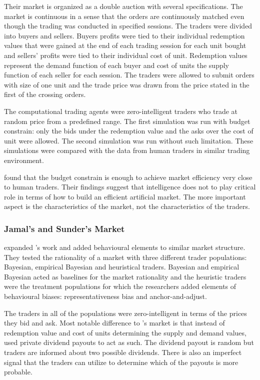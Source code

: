 Their market is organized as a double auction with several
specifications. The market is continuous in a sense that the 
orders are continuously matched even though the trading was
conducted in specified sessions. The traders were divided 
into buyers and sellers. Buyers profits were tied to their 
individual redemption values that were gained at the end of
each trading session for each unit bought and sellers' profits
were tied to their individual cost of unit. Redemption values
represent the demand function of each buyer and cost of units 
the supply function of each seller for each session. The
traders were allowed to submit orders with size of one unit
and the trade price was drawn from the price stated in the 
first of the crossing orders.

The computational trading agents were zero-intelligent traders 
who trade at random price from a predefined range. 
The first simulation was run with budget constrain: only the bids
under the redemption value and the asks over the cost of unit 
were allowed. The second simulation was run without such limitation.
These simulations were compared with the data from human traders
in similar trading environment.

\citeauthor{God93} found that the budget constrain is enough to 
achieve market efficiency very close to human traders. Their findings
suggest that intelligence does not to play critical role in terms of 
how to build an efficient artificial market. The more important aspect
is the characteristics of the market, not the characteristics of the traders.

\subsubsection{Jamal's and Sunder's Market}
\citet{Jam96} expanded \citeauthor{God93}'s work and added behavioural 
elements to similar market structure. They tested the rationality of
a market with three different trader populations: Bayesian, empirical
Bayesian and heuristical traders. Bayesian and empirical Bayesian acted
as baselines for the market rationality and the heuristic traders were
the treatment populations for which the researchers added elements of behavioural
biases: representativeness bias and anchor-and-adjust. 

The traders in all of the populations were zero-intelligent in terms of the
prices they bid and ask. Most notable difference to \citet{God93}'s market
is that instead of redemption value and cost of units determining the
supply and demand values, \citeauthor{Jam96} used private dividend payouts 
to act as such. The dividend payout is random but traders are informed
about two possible dividends. There is also an imperfect signal that the
traders can utilize to determine which of the payouts is more probable. 

